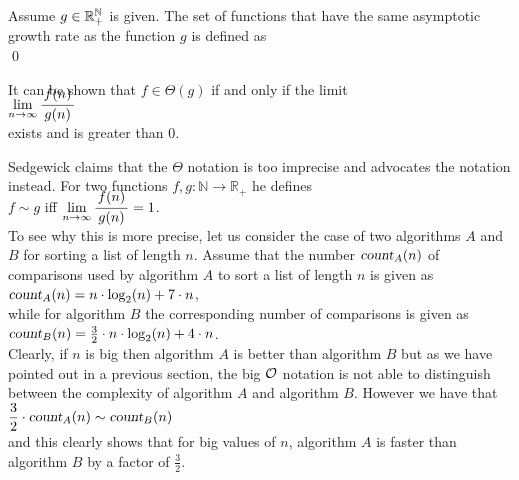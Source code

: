 \begin{Definition}[$\Theta(g)$]
  Assume $g \in {\mathbb R}_+^{{\mathbb N}}$ is given.   The set of functions that have the same asymptotic growth rate
  as the function $g$ is defined as
  \\[0.2cm]
  \hspace*{0.5cm} 
  \colorbox{red}{}
  \qed 
\end{Definition}

\noindent
It can be shown that $f \in \Theta(g)$ if and only if the limit
\\[0.4cm]
\hspace*{1.3cm}
$\lim\limits_{n \rightarrow \infty} \bruch{f(n)}{g(n)}$
\\[0.2cm]
exists and is greater than $0$.
\vspace*{0.3cm}

Sedgewick \cite{sedgewick:11} claims that the $\Theta$ notation is too imprecise and advocates the
 notation instead.  For two functions $f,g : \mathbb{N} \rightarrow \mathbb{R}_+$ he defines
\\[0.3cm]
\hspace*{1.3cm}
$f \sim g$ \quad iff \quad $\lim\limits_{n \rightarrow \infty} \bruch{f(n)}{g(n)} = 1$.
\\[0.2cm]
To see why this is more precise, let us consider the case of two algorithms $A$ and $B$ for sorting a list of length
$n$.   Assume that the number $\textsl{count}_A(n)$ of comparisons used by algorithm $A$ to sort a list of
length $n$ is given as
\\[0.2cm]
\hspace*{1.3cm}
$\textsl{count}_A(n) = n \cdot \log_2(n) + 7 \cdot n$,
\\[0.2cm]
while for algorithm $B$ the corresponding number of comparisons is given as
\\[0.2cm]
\hspace*{1.3cm}
$\textsl{count}_B(n) = \frac{3}{2} \cdot n \cdot \log_2(n) + 4 \cdot n$.
\\[0.2cm]
Clearly, if $n$ is big then algorithm $A$ is better than algorithm $B$ but as we have pointed out in a previous
section, the big $\mathcal{O}$ notation is not able to distinguish between the complexity of algorithm $A$ and
algorithm $B$.  However we have that
\\[0.2cm]
\hspace*{1.3cm}
$\displaystyle \frac{3}{2} \cdot \textsl{count}_A(n) \sim \textsl{count}_B(n)$
\\[0.2cm]
and this clearly shows that for big values of $n$, algorithm $A$ is faster than algorithm $B$ by a
factor of $\frac{3}{2}$.



